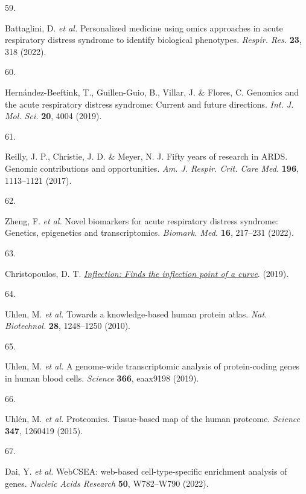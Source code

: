 \documentclass[
  11,
  a4paper,
]{article}
\newlength{\cslhangindent}
\newlength{\csllabelwidth}
\newlength{\cslentryspacingunit} %
\newenvironment{CSLReferences}[2] %
 {%
  \setlength{\parindent}{0pt}
  \ifodd #1
  \let\oldpar\par
  \def\par{\hangindent=\cslhangindent\oldpar}
  \fi
  \setlength{\parskip}{#2\cslentryspacingunit}
 }%
 {}
\newcommand{\CSLLeftMargin}[1]{\parbox[t]{\csllabelwidth}{#1}}
\newcommand{\CSLRightInline}[1]{\parbox[t]{\linewidth - \csllabelwidth}{#1}\break}
\begin{document}
\begin{CSLReferences}{0}{0}
\leavevmode{}%
\CSLLeftMargin{59. }%
\CSLRightInline{Battaglini, D. \emph{et al.} Personalized medicine using
omics approaches in acute respiratory distress syndrome to identify
biological phenotypes. \emph{Respir. Res.} \textbf{23}, 318 (2022).}

\leavevmode{}%
\CSLLeftMargin{60. }%
\CSLRightInline{Hernández-Beeftink, T., Guillen-Guio, B., Villar, J. \&
Flores, C. Genomics and the acute respiratory distress syndrome: Current
and future directions. \emph{Int. J. Mol. Sci.} \textbf{20}, 4004
(2019).}

\leavevmode{}%
\CSLLeftMargin{61. }%
\CSLRightInline{Reilly, J. P., Christie, J. D. \& Meyer, N. J. Fifty
years of research in {ARDS}. Genomic contributions and opportunities.
\emph{Am. J. Respir. Crit. Care Med.} \textbf{196}, 1113--1121 (2017).}

\leavevmode{}%
\CSLLeftMargin{62. }%
\CSLRightInline{Zheng, F. \emph{et al.} Novel biomarkers for acute
respiratory distress syndrome: Genetics, epigenetics and
transcriptomics. \emph{Biomark. Med.} \textbf{16}, 217--231 (2022).}

\leavevmode{}%
\CSLLeftMargin{63. }%
\CSLRightInline{Christopoulos, D. T.
\emph{\href{https://CRAN.R-project.org/package=inflection}{Inflection:
Finds the inflection point of a curve}}. (2019).}

\leavevmode{}%
\CSLLeftMargin{64. }%
\CSLRightInline{Uhlen, M. \emph{et al.} Towards a knowledge-based human
protein atlas. \emph{Nat. Biotechnol.} \textbf{28}, 1248--1250 (2010).}

\leavevmode{}%
\CSLLeftMargin{65. }%
\CSLRightInline{Uhlen, M. \emph{et al.} A genome-wide transcriptomic
analysis of protein-coding genes in human blood cells. \emph{Science}
\textbf{366}, eaax9198 (2019).}

\leavevmode{}%
\CSLLeftMargin{66. }%
\CSLRightInline{Uhlén, M. \emph{et al.} Proteomics. Tissue-based map of
the human proteome. \emph{Science} \textbf{347}, 1260419 (2015).}

\leavevmode{}%
\CSLLeftMargin{67. }%
\CSLRightInline{Dai, Y. \emph{et al.} {WebCSEA: web-based
cell-type-specific enrichment analysis of genes}. \emph{Nucleic Acids
Research} \textbf{50}, W782--W790 (2022).}


\end{CSLReferences}
\end{document}
